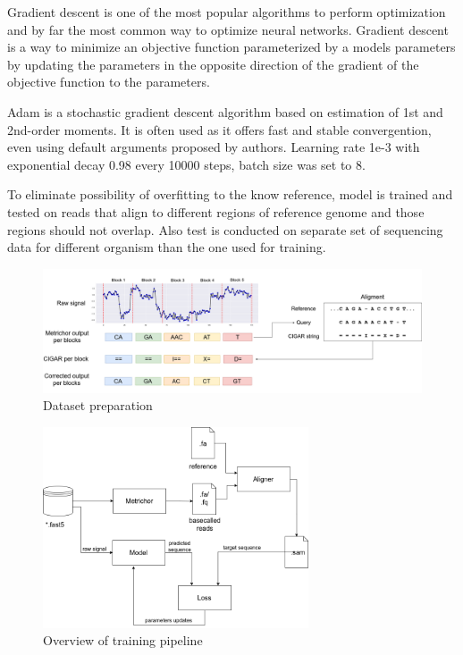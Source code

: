 \documentclass[times, utf8, diplomski, numeric, english]{fer}
\begin{document}
Gradient descent is one of the most popular algorithms to perform optimization and by far the most common way to optimize neural networks.  Gradient descent is a way to minimize an objective function parameterized by a models parameters  by updating the parameters in the opposite direction of the gradient of the objective function to the parameters.

Adam is a stochastic gradient descent algorithm based on estimation of 1st and 2nd-order moments.
It is often used as it offers fast and stable convergention, even using default arguments proposed by authors.
Learning rate 1e-3 with exponential decay 0.98 every 10000 steps, batch size was set to 8.



To eliminate possibility of overfitting to the know reference, model is trained and tested on reads that align to different regions of reference genome and those regions should not overlap. Also test is conducted on separate set of sequencing data for different organism than the one used for training. 

\begin{figure}[!ht]
	\begin{center}
		\includegraphics[width=1\textwidth]{./imgs/train_data_correction.png}
		\caption{Dataset preparation}
		\label{fg:data_correction}
	\end{center}
\end{figure}
\begin{figure}[!ht]
	\begin{center}
		\includegraphics[width=0.7\textwidth]{./imgs/train_pipeline.png}
		\caption{Overview of training pipeline}
		\label{fg:train_pipe}
	\end{center}
\end{figure}
\end{document}
